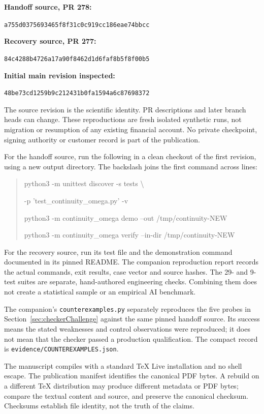\documentclass[11pt,a4paper]{article}
\begin{document}
\begin{scopebox}
\textbf{Handoff source, PR 278:}\par
\texttt{a755d0375693465f8f31c0c919cc186eae74bbcc}\par
\textbf{Recovery source, PR 277:}\par
\texttt{84c4288b4726a17a90f8462d1d6faf8b5f8f00b5}\par
\textbf{Initial main revision inspected:}\par
\texttt{48be73cd1259b9c212431b0fa1594a6c87698372}
\end{scopebox}
The source revision is the scientific identity. PR descriptions and later branch heads can change. These reproductions are fresh isolated synthetic runs, not migration or resumption of any existing financial account. No private checkpoint, signing authority or customer record is part of the publication.

For the handoff source, run the following in a clean checkout of the first revision, using a new output directory. The backslash joins the first command across lines:
\begin{quote}\small\ttfamily
python3 -m unittest discover -s tests \textbackslash{}\par
\hspace*{1em}-p 'test\_continuity\_omega.py' -v\par
python3 -m continuity\_omega demo --out /tmp/continuity-NEW\par
python3 -m continuity\_omega verify --in-dir /tmp/continuity-NEW
\end{quote}
For the recovery source, run its test file and the demonstration command documented in its pinned README. The companion reproduction report records the actual commands, exit results, case vector and source hashes. The 29- and 9-test suites are separate, hand-authored engineering checks. Combining them does not create a statistical sample or an empirical AI benchmark.

The companion's \texttt{counterexamples.py} separately reproduces the five probes in Section~\ref{sec:checkerChallenge} against the same pinned handoff source. Its success means the stated weaknesses and control observations were reproduced; it does not mean that the checker passed a production qualification. The compact record is \texttt{evidence/COUNTEREXAMPLES.json}.

The manuscript compiles with a standard TeX Live installation and no shell escape. The publication manifest identifies the canonical PDF bytes. A rebuild on a different TeX distribution may produce different metadata or PDF bytes; compare the textual content and source, and preserve the canonical checksum. Checksums establish file identity, not the truth of the claims.
\end{document}
